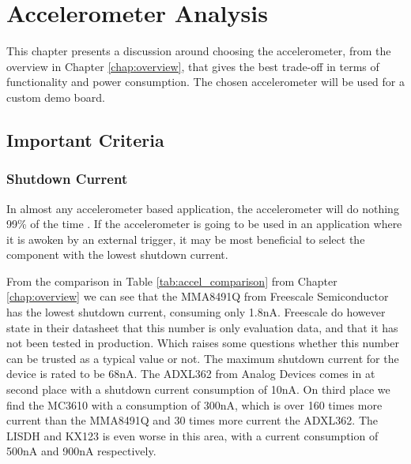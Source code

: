 \chapter{Accelerometer Analysis}


This chapter presents a discussion around choosing the accelerometer, from the overview in Chapter \ref{chap:overview}, that gives the best trade-off in terms of functionality and power consumption. The chosen accelerometer will be used for a custom demo board.

\section{Important Criteria}

\subsection{Shutdown Current}

In almost any accelerometer based application, the accelerometer will do nothing 99\% of the time \cite{moldsvor15}. If the accelerometer is going to be used in an application where it is awoken by an external trigger, it may be most beneficial to select the component with the lowest shutdown current. 

From the comparison in Table \ref{tab:accel_comparison} from Chapter \ref{chap:overview} we can see that the MMA8491Q from Freescale Semiconductor has the lowest shutdown current, consuming only 1.8nA. Freescale do however state in their datasheet \cite[p~9]{MMA8491Q} that this number is only evaluation data, and that it has not been tested in production. Which raises some questions whether this number can be trusted as a typical value or not. The maximum shutdown current for the device is rated to be 68nA. The ADXL362 from Analog Devices comes in at second place with a shutdown current consumption of 10nA. On third place we find the MC3610 with a consumption of 300nA, which is over 160 times more current than the MMA8491Q and 30 times more current the ADXL362. The LISDH and KX123 is even worse in this area, with a current consumption of 500nA and 900nA respectively. 

